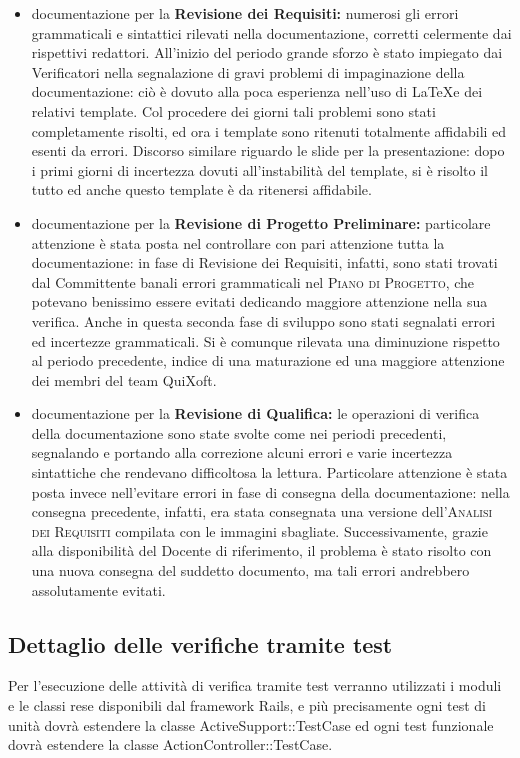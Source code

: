 \documentclass[11pt,a4paper]{article}
\begin{document}
\begin{itemize}
 \item documentazione per la \textbf{Revisione dei Requisiti:} numerosi gli errori grammaticali e sintattici rilevati nella documentazione, corretti celermente dai rispettivi redattori. All'inizio del periodo grande sforzo è stato impiegato dai Verificatori nella segnalazione di gravi problemi di impaginazione della documentazione: ciò è dovuto alla poca esperienza nell'uso di \LaTeX \space e dei relativi template. Col procedere dei giorni tali problemi sono stati completamente risolti, ed ora i template sono ritenuti totalmente affidabili ed esenti da errori. Discorso similare riguardo le slide per la presentazione: dopo i primi giorni di incertezza dovuti all'instabilità del template, si è risolto il tutto ed anche questo template è da ritenersi affidabile.
 \item documentazione per la \textbf{Revisione di Progetto Preliminare:} particolare attenzione è stata posta nel controllare con pari attenzione tutta la documentazione: in fase di Revisione dei Requisiti, infatti, sono stati trovati dal Committente banali errori grammaticali nel \textsc{Piano di Progetto}, che potevano benissimo essere evitati dedicando maggiore attenzione nella sua verifica. Anche in questa seconda fase di sviluppo sono stati segnalati errori ed incertezze grammaticali. Si è comunque rilevata una diminuzione rispetto al periodo precedente, indice di una maturazione ed una maggiore attenzione dei membri del team QuiXoft.
 \item documentazione per la \textbf{Revisione di Qualifica:} le operazioni di verifica della documentazione sono state svolte come nei periodi precedenti, segnalando e portando alla correzione alcuni errori e varie incertezza sintattiche che rendevano difficoltosa la lettura. Particolare attenzione è stata posta invece nell'evitare errori in fase di consegna della documentazione: nella consegna precedente, infatti, era stata consegnata una versione dell'\textsc{Analisi dei Requisiti} compilata con le immagini sbagliate. Successivamente, grazie alla disponibilità del Docente di riferimento, il problema è stato risolto con una nuova consegna del suddetto documento, ma tali errori andrebbero assolutamente evitati.
\end{itemize}
\subsection{Dettaglio delle verifiche tramite test}
Per l'esecuzione delle attività di verifica tramite test verranno utilizzati i moduli e le classi rese disponibili dal framework Rails, e più precisamente ogni test di unità dovrà estendere la classe ActiveSupport::TestCase ed ogni test funzionale dovrà estendere la classe ActionController::TestCase.
\end{document}
